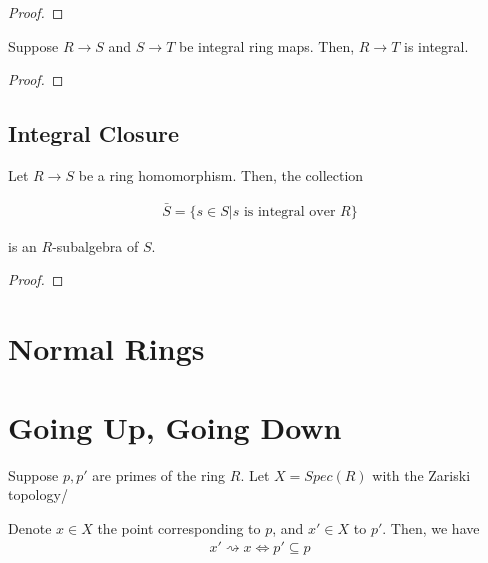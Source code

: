 \documentclass[Total.tex]{subfiles}
\begin{document}
			\begin{proof}
			\end{proof}
			
			\begin{lemma}
				Suppose $R\rightarrow S$ and $S\rightarrow T$ be integral ring maps. Then, $R\rightarrow T$ is integral.
			\end{lemma}
			
			\begin{proof}
			\end{proof}
			
			\subsection{Integral Closure}
			
			\begin{lemma}
				Let $R\rightarrow S$ be a ring homomorphism. Then, the collection
				
				\begin{gather*}
					\bar{S}=\{s\in S|s\mbox{ is integral over }R\}
				\end{gather*}
				
				is an $R$-subalgebra of $S$.
			\end{lemma}
			
			\begin{proof}
			\end{proof}
			
			\begin{Def}
			\end{Def}
			
		\section{Normal Rings}
		
			\begin{Def}
			\end{Def}
			
		\section{Going Up, Going Down}
			\qquad Suppose $p,p'$ are primes of the ring $R$. Let $X=Spec(R)$ with the Zariski topology/
			
			Denote $x\in X$ the point corresponding to $p$, and $x'\in X$ to $p'$. Then, we have
			\begin{gather*}
				x'\rightsquigarrow x\Leftrightarrow p'\subseteq p
			\end{gather*}
			
\end{document}
